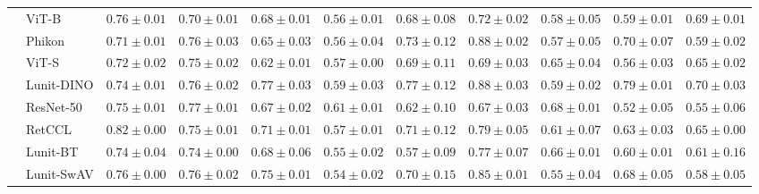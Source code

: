 \begin{tabular}{ll|cccc|c|cccc}
 & ViT-B & $0.76 \pm 0.01$ & $0.70 \pm 0.01$ & $0.68 \pm 0.01$ & $0.56 \pm 0.01$ & $0.68 \pm 0.08$ & $0.72 \pm 0.02$ & $0.58 \pm 0.05$ & $0.59 \pm 0.01$ & $0.69 \pm 0.01$ \\
 & Phikon & $0.71 \pm 0.01$ & $0.76 \pm 0.03$ & $0.65 \pm 0.03$ & $0.56 \pm 0.04$ & $0.73 \pm 0.12$ & $0.88 \pm 0.02$ & $0.57 \pm 0.05$ & $0.70 \pm 0.07$ & $0.59 \pm 0.02$ \\
 & ViT-S & $0.72 \pm 0.02$ & $0.75 \pm 0.02$ & $0.62 \pm 0.01$ & $0.57 \pm 0.00$ & $0.69 \pm 0.11$ & $0.69 \pm 0.03$ & $0.65 \pm 0.04$ & $0.56 \pm 0.03$ & $0.65 \pm 0.02$ \\
 & Lunit-DINO & $0.74 \pm 0.01$ & $0.76 \pm 0.02$ & $\mathbf{0.77 \pm 0.03}$ & $0.59 \pm 0.03$ & $\mathbf{0.77 \pm 0.12}$ & $\mathbf{0.88 \pm 0.03}$ & $0.59 \pm 0.02$ & $\mathbf{0.79 \pm 0.01}$ & $\mathbf{0.70 \pm 0.03}$ \\
 & ResNet-50 & $0.75 \pm 0.01$ & $\mathbf{0.77 \pm 0.01}$ & $0.67 \pm 0.02$ & $0.61 \pm 0.01$ & $0.62 \pm 0.10$ & $0.67 \pm 0.03$ & $\mathbf{0.68 \pm 0.01}$ & $0.52 \pm 0.05$ & $0.55 \pm 0.06$ \\
 & RetCCL & $0.82 \pm 0.00$ & $0.75 \pm 0.01$ & $0.71 \pm 0.01$ & $0.57 \pm 0.01$ & $0.71 \pm 0.12$ & $0.79 \pm 0.05$ & $0.61 \pm 0.07$ & $0.63 \pm 0.03$ & $0.65 \pm 0.00$ \\
 & Lunit-BT & $0.74 \pm 0.04$ & $0.74 \pm 0.00$ & $0.68 \pm 0.06$ & $0.55 \pm 0.02$ & $0.57 \pm 0.09$ & $0.77 \pm 0.07$ & $0.66 \pm 0.01$ & $0.60 \pm 0.01$ & $0.61 \pm 0.16$ \\
 & Lunit-SwAV & $0.76 \pm 0.00$ & $0.76 \pm 0.02$ & $0.75 \pm 0.01$ & $0.54 \pm 0.02$ & $0.70 \pm 0.15$ & $0.85 \pm 0.01$ & $0.55 \pm 0.04$ & $0.68 \pm 0.05$ & $0.58 \pm 0.05$ \\
\cline{1-11}
\bottomrule
\end{tabular}
